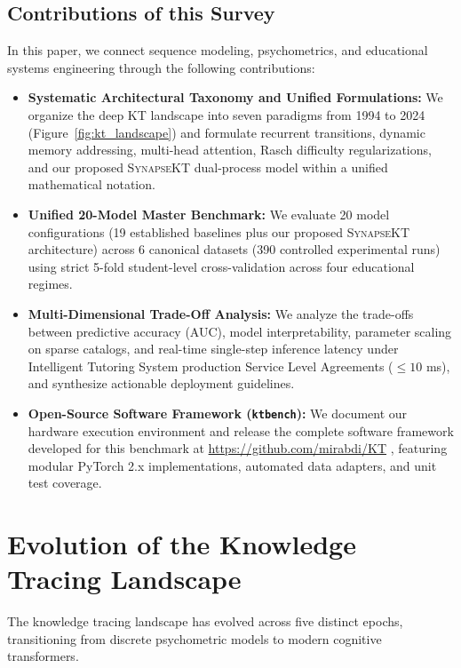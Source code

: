\documentclass[11pt]{article}
\begin{document}
\subsection{Contributions of this Survey}
In this paper, we connect sequence modeling, psychometrics, and educational systems engineering through the following contributions:
\begin{itemize}
    \item \textbf{Systematic Architectural Taxonomy and Unified Formulations:} We organize the deep KT landscape into seven paradigms from 1994 to 2024 (Figure~\ref{fig:kt_landscape}) and formulate recurrent transitions, dynamic memory addressing, multi-head attention, Rasch difficulty regularizations, and our proposed \textsc{SynapseKT} dual-process model within a unified mathematical notation.
    \item \textbf{Unified 20-Model Master Benchmark:} We evaluate 20 model configurations (19 established baselines plus our proposed \textsc{SynapseKT} architecture) across 6 canonical datasets (390 controlled experimental runs) using strict 5-fold student-level cross-validation across four educational regimes.
    \item \textbf{Multi-Dimensional Trade-Off Analysis:} We analyze the trade-offs between predictive accuracy (AUC), model interpretability, parameter scaling on sparse catalogs, and real-time single-step inference latency under Intelligent Tutoring System production Service Level Agreements ($\le 10$ ms), and synthesize actionable deployment guidelines.
    \item \textbf{Open-Source Software Framework (\texttt{ktbench}):} We document our hardware execution environment and release the complete software framework developed for this benchmark at \url{https://github.com/mirabdi/KT} \citep{abdimutalipov2024ktbench}, featuring modular PyTorch 2.x implementations, automated data adapters, and unit test coverage.
\end{itemize}

\section{Evolution of the Knowledge Tracing Landscape}
\label{sec:landscape}

The knowledge tracing landscape has evolved across five distinct epochs, transitioning from discrete psychometric models to modern cognitive transformers.
\end{document}
